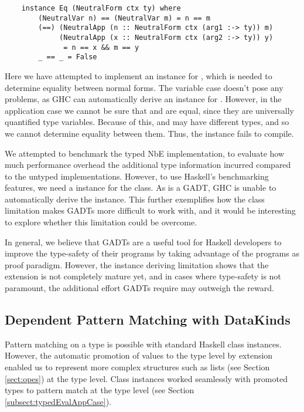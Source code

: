 \begin{lstlisting}
    instance Eq (NeutralForm ctx ty) where
        (NeutralVar n) == (NeutralVar m) = n == m
        (==) (NeutralApp (n :: NeutralForm ctx (arg1 :-> ty)) m) 
             (NeutralApp (x :: NeutralForm ctx (arg2 :-> ty)) y) 
              = n == x && m == y 
        _ == _ = False
\end{lstlisting}

Here we have attempted to implement an  instance for , which is needed to determine equality between normal forms. The variable case doesn't pose any problems, as GHC can automatically derive an  instance for . However, in the application case we cannot be sure that  and  are equal, since they are universally quantified type variables. Because of this,  and  may have different types, and so we cannot determine equality between them. Thus, the instance fails to compile.

We attempted to benchmark the typed NbE implementation, to evaluate how much performance overhead the additional type information incurred compared to the untyped implementations. However, to use Haskell's benchmarking features, we need a  instance for the  class. As  is a GADT, GHC is unable to automatically derive the instance. This further exemplifies how the class limitation makes GADTs more difficult to work with, and it would be interesting to explore whether this limitation could be overcome.

In general, we believe that GADTs are a useful tool for Haskell developers to improve the type-safety of their programs by taking advantage of the programs as proof paradigm. However, the instance deriving limitation shows that the extension is not completely mature yet, and in cases where type-safety is not paramount, the additional effort GADTs require may outweigh the reward. 

\subsection{Dependent Pattern Matching with DataKinds}

Pattern matching on a type is possible with standard Haskell class instances. However, the automatic promotion of values to the type level by  extension enabled us to represent more complex structures such as lists (see Section \ref{sect:opes}) at the type level. Class instances worked seamlessly with  promoted types to pattern match at the type level (see Section \ref{subsect:typedEvalAppCase}).


